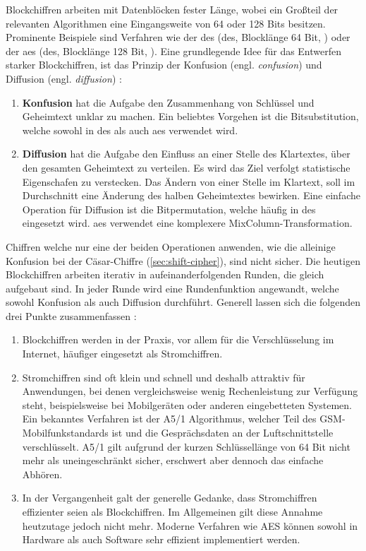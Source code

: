 \noindent
Blockchiffren arbeiten mit Datenblöcken fester Länge, wobei ein Großteil der
relevanten Algorithmen eine Eingangsweite von 64 oder 128 Bits besitzen.
Prominente Beispiele sind Verfahren wie der \acl{des}
(\acs{des}, Blocklänge 64 Bit, \cite[55-58]{BOOK:crypto}) oder der \acl{aes}
(\acs{des}, Blocklänge 128 Bit, \cite[87-90]{BOOK:crypto}).
Eine grundlegende Idee für das Entwerfen starker Blockchiffren, ist das Prinzip
der Konfusion (engl. \textit{confusion}) und
Diffusion (engl. \textit{diffusion}) \parencite[57]{BOOK:crypto}:
\begin{enumerate}
  \item \textbf{Konfusion} hat die Aufgabe den
        Zusammenhang von Schlüssel und Geheimtext unklar zu machen. Ein
        beliebtes Vorgehen ist die Bitsubstitution, welche sowohl in \acs{des} als auch
        \acs{aes} verwendet wird.
  \item \textbf{Diffusion} hat die Aufgabe den Einfluss
        an einer Stelle des Klartextes, über den gesamten Geheimtext zu verteilen. Es wird
        das Ziel verfolgt
        statistische Eigenschafen zu verstecken. Das Ändern von einer Stelle im Klartext,
        soll im Durchschnitt eine Änderung des halben Geheimtextes bewirken. Eine einfache
        Operation für Diffusion ist die Bitpermutation, welche häufig in \acs{des} eingesetzt wird.
        \acs{aes} verwendet eine komplexere MixColumn-Transformation.
\end{enumerate}
Chiffren welche nur eine der beiden Operationen anwenden, wie die alleinige Konfusion bei der
Cäsar-Chiffre (\autoref{sec:shift-cipher}), sind nicht sicher. Die heutigen Blockchiffren
arbeiten iterativ in aufeinanderfolgenden Runden, die gleich aufgebaut sind. In jeder Runde wird eine
Rundenfunktion angewandt, welche sowohl Konfusion als auch Diffusion durchführt.
Generell lassen sich die folgenden drei Punkte zusammenfassen \parencite[31]{BOOK:crypto}:

\begin{enumerate}
  \item Blockchiffren werden in der Praxis, vor allem für die Verschlüsselung im Internet,
        häufiger eingesetzt als Stromchiffren.
  \item Stromchiffren sind oft klein und schnell und deshalb attraktiv für Anwendungen,
        bei denen vergleichsweise wenig Rechenleistung zur Verfügung steht, beispielsweise bei
        Mobilgeräten oder anderen eingebetteten Systemen. Ein bekanntes Verfahren ist der
        A5/1 Algorithmus, welcher Teil des GSM-Mobilfunkstandards ist und die Gesprächsdaten
        an der Luftschnittstelle verschlüsselt. A5/1 gilt aufgrund der kurzen Schlüssellänge von
        64 Bit nicht mehr als uneingeschränkt sicher, erschwert aber dennoch das einfache Abhören.
  \item In der Vergangenheit galt der generelle Gedanke, dass Stromchiffren
        effizienter seien als Blockchiffren.
        Im Allgemeinen gilt diese Annahme heutzutage jedoch nicht mehr. Moderne Verfahren wie AES
        können sowohl in Hardware als auch Software sehr effizient implementiert werden.
\end{enumerate}

